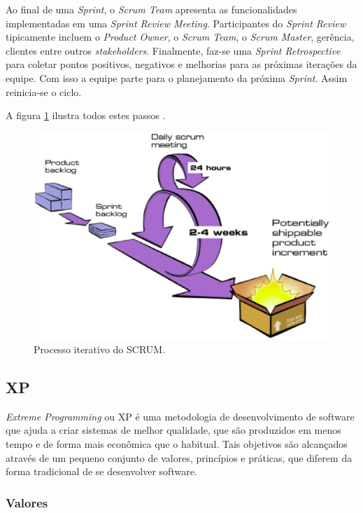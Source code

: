 Ao final de uma \textit{Sprint}, o \textit{Scrum Team} apresenta as funcionalidades implementadas em uma \textit{Sprint
Review Meeting}.  Participantes do \textit{Sprint Review} tipicamente incluem o \textit{Product Owner}, o \textit{Scrum
Team}, o \textit{Scrum Master}, gerência, clientes entre outros \textit{stakeholders}. Finalmente, faz-se uma \textit{Sprint Retrospective} para coletar pontos positivos, negativos e melhorias para as próximas iterações da equipe. Com isso a equipe parte para o planejamento da próxima \textit{Sprint}. Assim reinicia-se o ciclo. \cite{scrum}

A figura \ref{fig:scrum} ilustra todos estes passos \cite{scrum}.

\begin{figure}[h!]
	\centering
  \includegraphics[keepaspectratio=true,scale=0.5]{figuras/scrum.eps}
  \caption{Processo iterativo do SCRUM.}
	\label{fig:scrum}
\end{figure}

\subsection{XP}

\textit{Extreme Programming} ou XP é uma metodologia de desenvolvimento de software que ajuda a criar sistemas de melhor qualidade, que são produzidos em menos tempo e de forma mais econômica que o habitual. Tais objetivos são alcançados através de um pequeno conjunto de valores, princípios e práticas, que diferem da forma tradicional de se desenvolver software. \cite{xp}

\subsubsection{Valores}

